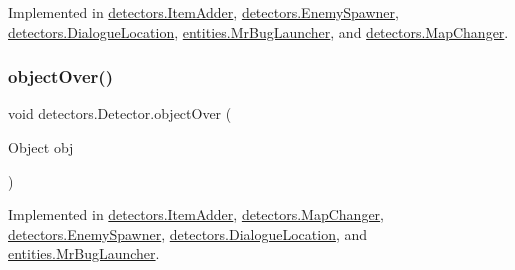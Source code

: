 Implemented in \mbox{\hyperlink{classdetectors_1_1_item_adder_ae42202ce2878233f85ab4a7b2d446140}{detectors.\+Item\+Adder}}, \mbox{\hyperlink{classdetectors_1_1_enemy_spawner_ab55d4ed3cd9441360ad9bae40436216e}{detectors.\+Enemy\+Spawner}}, \mbox{\hyperlink{classdetectors_1_1_dialogue_location_a3417163c536b0e5ba2b362e9548da7b6}{detectors.\+Dialogue\+Location}}, \mbox{\hyperlink{classentities_1_1_mr_bug_launcher_a088ee997aa4bd9c04748b6339b682391}{entities.\+Mr\+Bug\+Launcher}}, and \mbox{\hyperlink{classdetectors_1_1_map_changer_a6aa16432a59706e55237c61cde2e3336}{detectors.\+Map\+Changer}}.

\mbox{\label{interfacedetectors_1_1_detector_ab35eeb78e8216f8100d4651993668d44}} 
\subsubsection{\texorpdfstring{object\+Over()}{objectOver()}}
{\footnotesize\ttfamily void detectors.\+Detector.\+object\+Over (\begin{DoxyParamCaption}\item[{Object}]{obj }\end{DoxyParamCaption})}



Implemented in \mbox{\hyperlink{classdetectors_1_1_item_adder_a434a5f13dfd6987f9a55f9ccb7cf0d68}{detectors.\+Item\+Adder}}, \mbox{\hyperlink{classdetectors_1_1_map_changer_a4803cdf3ccad2502423706f266869a72}{detectors.\+Map\+Changer}}, \mbox{\hyperlink{classdetectors_1_1_enemy_spawner_aa3dd6110b4138a184c02012cdb75242e}{detectors.\+Enemy\+Spawner}}, \mbox{\hyperlink{classdetectors_1_1_dialogue_location_af092a66a660c8ba78a170b5c4b2af99a}{detectors.\+Dialogue\+Location}}, and \mbox{\hyperlink{classentities_1_1_mr_bug_launcher_a036f3d0b9c8faafa000c44a34ca77b2e}{entities.\+Mr\+Bug\+Launcher}}.

